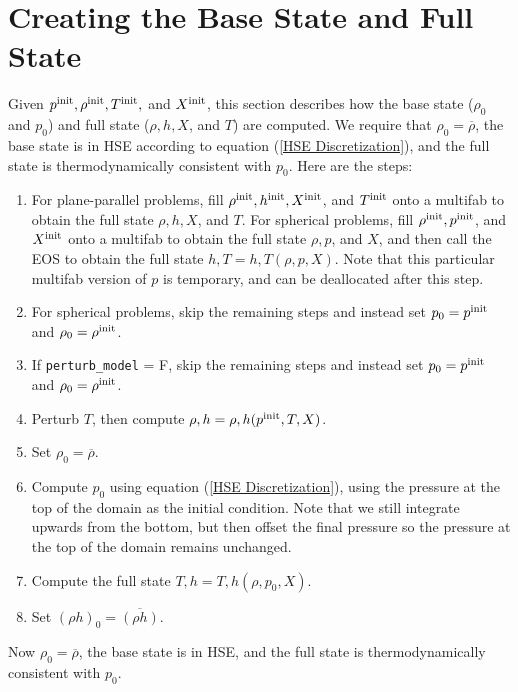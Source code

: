 \documentclass[11pt]{article}
\def\init  {\rm init}
\begin{document}
\section{Creating the Base State and Full State}\label{Sec:Creating the Base State and Full State}
Given $p^{\init}, \rho^{\init}, T^{\init},$ and $X^{\init}$, this section describes how the base state ($\rho_0$ and $p_0$) and full state ($\rho, h, X$, and $T$) are computed.  We require that $\rho_0 = \overline\rho$, the base state is in HSE according to equation (\ref{HSE Discretization}), and the full state is thermodynamically consistent with $p_0$.  Here are the steps:
\begin{enumerate}
\item For plane-parallel problems, fill $\rho^{\init}, h^{\init}, X^{\init}$, and $T^{\init}$ onto a multifab to obtain the full state $\rho, h, X$, and $T$.  For spherical problems, fill $\rho^{\init}, p^{\init}$, and $X^{\init}$ onto a multifab to obtain the full state $\rho, p$, and $X$, and then call the EOS to obtain the full state $h,T = h,T(\rho,p,X)$.  Note that this particular multifab version of $p$ is temporary, and can be deallocated after this step.
\item For spherical problems, skip the remaining steps and instead set $p_0 = p^{\init}$ and $\rho_0 = \rho^{\init}$.
\item If {\tt perturb\_model} = F, skip the remaining steps and instead set $p_0 = p^{\init}$ and $\rho_0 = \rho^{\init}$.
\item Perturb $T$, then compute $\rho,h = \rho,h(p^{\init},T,X)$.
\item Set $\rho_0 = \overline\rho$.
\item Compute $p_0$ using equation (\ref{HSE Discretization}), using the pressure at the top of the domain as the initial condition.  Note that we still integrate upwards from the bottom, but then offset the final pressure so the pressure at the top of the domain remains unchanged.
\item Compute the full state $T,h = T,h(\rho,p_0,X)$.
\item Set $(\rho h)_0 = \overline{(\rho h)}$.
\end{enumerate}
Now $\rho_0 = \overline\rho$, the base state is in HSE, and the full state is thermodynamically consistent with $p_0$.
\end{document}
